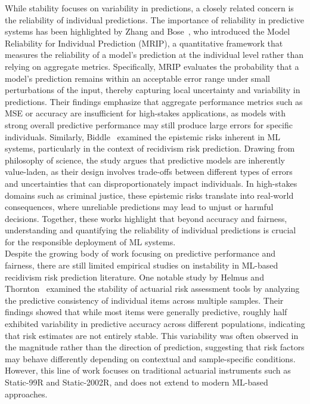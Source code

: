 \documentclass[12pt]{article}
\begin{document}
While stability focuses on variability in predictions, a closely related concern is the reliability of individual predictions. The importance of reliability in predictive systems has been highlighted by Zhang and Bose~\cite{zhang2024reliability}, who introduced the Model Reliability for Individual Prediction (MRIP), a quantitative framework that measures the reliability of a model's prediction at the individual level rather than relying on aggregate metrics. Specifically, MRIP evaluates the probability that a model's prediction remains within an acceptable error range under small perturbations of the input, thereby capturing local uncertainty and variability in predictions. Their findings emphasize that aggregate performance metrics such as MSE or accuracy are insufficient for high-stakes applications, as models with strong overall predictive performance may still produce large errors for specific individuals. Similarly, Biddle~\cite{biddle2022predicting} examined the epistemic risks inherent in ML systems, particularly in the context of recidivism risk prediction. Drawing from philosophy of science, the study argues that predictive models are inherently value-laden, as their design involves trade-offs between different types of errors and uncertainties that can disproportionately impact individuals. In high-stakes domains such as criminal justice, these epistemic risks translate into real-world consequences, where unreliable predictions may lead to unjust or harmful decisions. Together, these works highlight that beyond accuracy and fairness, understanding and quantifying the reliability of individual predictions is crucial for the responsible deployment of ML systems.\\

Despite the growing body of work focusing on predictive performance and fairness, there are still limited empirical studies on instability in ML-based recidivism risk prediction literature. One notable study by Helmus and Thornton~\cite{helmus2015stability} examined the stability of actuarial risk assessment tools by analyzing the predictive consistency of individual items across multiple samples. Their findings showed that while most items were generally predictive, roughly half exhibited variability in predictive accuracy across different populations, indicating that risk estimates are not entirely stable. This variability was often observed in the magnitude rather than the direction of prediction, suggesting that risk factors may behave differently depending on contextual and sample-specific conditions. However, this line of work focuses on traditional actuarial instruments such as Static-99R and Static-2002R, and does not extend to modern ML-based approaches.\\
\end{document}
